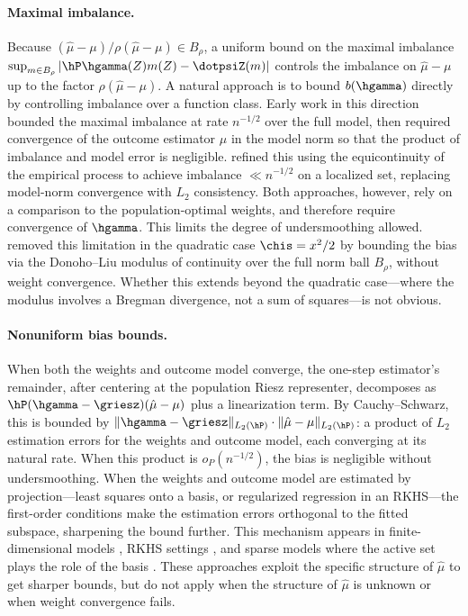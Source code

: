 \documentclass{article}
\begin{document}
\paragraph{Maximal imbalance.}
Because $(\hat\mu - \mu)/\rho(\hat\mu - \mu) \in B_\rho$,
a uniform bound on the maximal imbalance
$\sup_{m \in B_\rho}
  |\hP \hgamma(Z) m(Z) - \dotpsiZ(m)|$
controls the imbalance on $\hat\mu - \mu$
up to the factor $\rho(\hat\mu - \mu)$.
A natural approach is to bound
$b(\hgamma)$ directly
by controlling imbalance
over a function class.
Early work in this direction
\citep{athey2018approximate,kallus2020generalized}
bounded the maximal imbalance
at rate $n^{-1/2}$
over the full model,
then required convergence
of the outcome estimator
$\hat\mu$ in the model norm
so that the product
of imbalance and model error
is negligible.
\citet{hirshberg2018augmented}
refined this
using the equicontinuity
of the empirical process
to achieve imbalance $\ll n^{-1/2}$
on a localized set,
replacing model-norm convergence
with $L_2$ consistency.
Both approaches, however,
rely on a comparison
to the population-optimal weights,
and therefore require
convergence of $\hgamma$.
This limits the degree
of undersmoothing allowed.
\citet{kong2025asymptotics}
removed this limitation
in the quadratic case
$\chis = x^2/2$
by bounding the bias
via the Donoho--Liu modulus of continuity
over the full norm ball $B_\rho$,
without weight convergence.
Whether this extends
beyond the quadratic case---where
the modulus involves a Bregman divergence,
not a sum of squares---is not obvious.

\paragraph{Nonuniform bias bounds.}
When both the weights and outcome model converge,
the one-step estimator's remainder,
after centering at the population Riesz representer,
decomposes as
$\hP(\hgamma - \griesz)(\hat\mu - \mu)$
plus a linearization term.
By Cauchy--Schwarz,
this is bounded by
$\|\hgamma - \griesz\|_{L_2(\hP)}
\cdot \|\hat\mu - \mu\|_{L_2(\hP)}$:
a product of $L_2$ estimation errors
for the weights and outcome model,
each converging at its natural rate.
When this product is $o_P(n^{-1/2})$,
the bias is negligible without undersmoothing.
When the weights and outcome model
are estimated by projection---least
squares onto a basis,
or regularized regression
in an RKHS---the
first-order conditions
make the estimation errors
orthogonal to the fitted subspace,
sharpening the bound further.
This mechanism appears
in finite-dimensional models
\citep{vermeulen2015bias,avagyan2017honest,tan2010bounded},
RKHS settings
\citep{hirshberg2018augmented},
and sparse models
where the active set
plays the role of the basis
\citep{bradic2019sparsity,bradic2019minimax}.
These approaches exploit the specific structure
of $\hat\mu$ to get sharper bounds,
but do not apply when
the structure of $\hat\mu$ is unknown
or when weight convergence fails.
\end{document}
